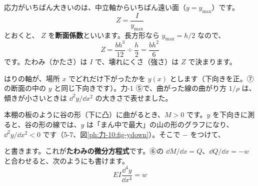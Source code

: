 応力がいちばん大きいのは、中立軸からいちばん遠い面（$y=y_{\max}$）です。
\[Z=\frac{I}{y_{\max}}\]
とおくと、
$Z$ を\textbf{断面係数}といいます。長方形なら $y_{\max}=h/2$ なので、
\[Z=\frac{bh^3}{12}\div\frac{h}{2}=\frac{bh^2}{6}\]
です。たわみ（かたさ）は $I$ で、壊れにくさ（強さ）は $Z$ で決まります。

\label{ph:力-10:sec8}はりの軸が、場所 $x$ でどれだけ下がったかを $y(x)$ とします（下向きを正。⑦の断面の中の $y$ と同じ下向きです）。力-1 ⑤で、曲がった線の曲がり方 $1/\rho$ は、傾きが小さいときは $\dd^2y/\dd x^2$ の大きさで表せました。

\noindent\begin{minipage}[c]{0.47\linewidth}
本棚の板のように谷の形（下に凸）に曲がるとき、$M>0$ です。$y$ を下向きに測ると、谷の形の線では、$y$ は「まん中で最大」の山の形のグラフになり、$\dd^2y/\dd x^2<0$ です（5-7、図\ref{ph:力-10:fig-ydown}）。そこで $-$ をつけて、
\end{minipage}\hfill
\begin{minipage}[c]{0.49\linewidth}
\centering
{}
\label{ph:力-10:fig-ydown}
\end{minipage}
\label{ph:力-10:taw}
と書きます。これが\textbf{たわみの微分方程式}です。⑥の $\dd M/\dd x=Q$、$\dd Q/\dd x=-w$ と合わせると、次のようにも書けます。
\[EI\frac{\dd^4y}{\dd x^4}=w\]

